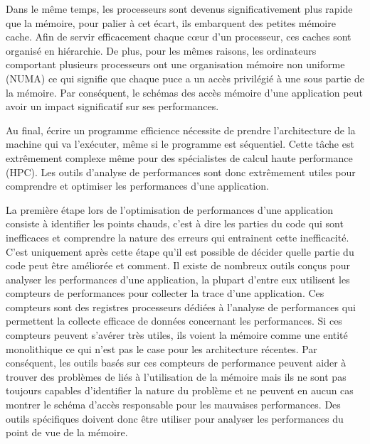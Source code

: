 Dans le même temps, les processeurs sont devenus significativement plus rapide que la mémoire, pour palier à cet écart, ils embarquent des petites mémoire cache.
Afin de servir efficacement chaque cœur d'un processeur, ces caches sont organisé en hiérarchie.
De plus, pour les mêmes raisons, les ordinateurs comportant plusieurs processeurs ont une organisation mémoire non uniforme (NUMA) ce qui signifie que chaque puce a un accès privilégié à une sous partie de la mémoire.
Par conséquent, le schémas des accès mémoire d'une application peut avoir un impact significatif sur ses performances.

Au final, écrire un programme efficience nécessite de prendre l'architecture de la machine qui va l'exécuter, même si le programme est séquentiel.
Cette t\^ache est extrêmement complexe même pour des spécialistes de calcul haute performance (HPC).
Les outils d'analyse de performances sont donc extrêmement utiles pour comprendre et optimiser les performances d'une application.

La première étape lors de l'optimisation de performances d'une application consiste à identifier les points chauds, c'est à dire les parties du code qui sont inefficaces et comprendre la nature des erreurs qui entrainent cette inefficacité.
C'est uniquement après cette étape qu'il est possible de décider quelle partie du code peut être améliorée et comment.
Il existe de nombreux outils conçus pour analyser les performances d'une application, la plupart d'entre eux utilisent les compteurs de performances pour collecter la trace d'une application.
Ces compteurs sont des registres processeurs dédiées à l'analyse de performances qui permettent la collecte efficace de données concernant les performances.
Si ces compteurs peuvent s'avérer très utiles, ils voient la mémoire comme une entité monolithique ce qui n'est pas le case pour les architecture récentes.
Par conséquent, les outils basés sur ces compteurs de performance peuvent aider à trouver des problèmes de liés à l'utilisation de la mémoire mais ils ne sont pas toujours capables d'identifier la nature  du problème et ne peuvent en aucun cas montrer le schéma d'accès responsable pour les mauvaises performances.
Des outils spécifiques doivent donc être utiliser pour analyser les performances du point de vue de la mémoire.

